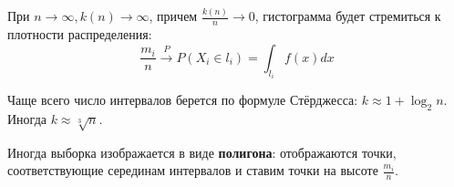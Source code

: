 \begin{theorem}
    При \(n \to \infty, k(n) \to \infty\), причем \(\frac{k(n)}{n} \to 0\), гистограмма будет стремиться к плотности распределения:
    \[\frac{m_i}{n} \xrightarrow{P} P(X_i \in l_i) = \int_{l_i} f(x)dx\]
\end{theorem}
Чаще всего число интервалов берется по формуле Стёрджесса: \(k \approx 1 + \log_2 n\). Иногда \(k \approx \sqrt[3]{n}\).

\begin{remark}
    Иногда выборка изображается в виде \textbf{полигона}: отображаются точки, соответствующие серединам интервалов и ставим точки на высоте \(\frac{m_i}{n}\).
\end{remark}

\begin{figure}
    \centering
    \begin{minipage}{.5\textwidth}
        \centering
        \label{fig:test1}
    \end{minipage}%
    \begin{minipage}{.5\textwidth}
        \centering
        \label{fig:test2}
    \end{minipage}
\end{figure}
